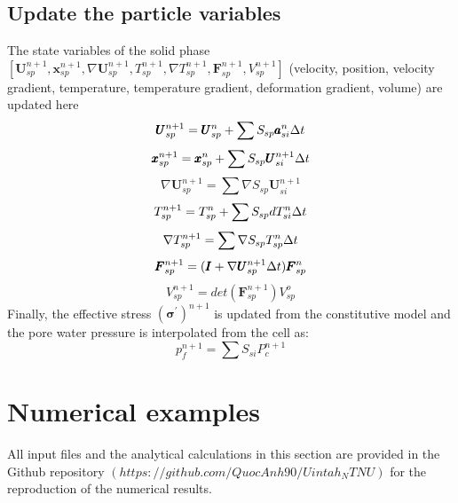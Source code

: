 \documentclass[preprint,12pt]{elsarticle}
\begin{document}
\subsection{\textsf{Update the particle variables}}
%
%
The state variables of the solid phase $[\pmb{U}_{sp}^{n+1},\pmb{x}_{sp}^{n+1},\nabla \pmb{U}_{sp}^{n+1}, T_{sp}^{n+1},  \nabla T_{sp}^{n+1}, \pmb{F}_{sp}^{n+1},V_{sp}^{n+1}]$ (velocity, position, velocity gradient, temperature, temperature gradient, deformation gradient, volume) are updated here 
%
%
\begin{equation}
     \pmb{U}_{sp}^{n+1} = \pmb{U}_{sp}^n + \sum{S_{sp} \pmb{a}_{si}^n \ensuremath{\Delta{t}} } 
\end {equation}
%
%
\begin{equation}
     \pmb{x}_{sp}^{n+1} = \pmb{x}_{sp}^n + \sum{S_{sp} \pmb{U}_{si}^{n+1} \ensuremath{\Delta{t}} } 
\end {equation}
%
%
\begin{equation}
    \nabla \pmb{U}_{sp}^{n+1} = \sum{\nabla S_{sp} \pmb{U}_{si}^{n+1}} 
\end {equation}
%
%
\begin{equation}
     T_{sp}^{n+1} = T_{sp}^n + \sum{S_{sp} dT_{si}^n \ensuremath{\Delta{t}} } 
\end {equation}
%
%
\begin{equation}
     \nabla T_{sp}^{n+1} = \sum{\nabla S_{sp} T_{sp}^n \ensuremath{\Delta{t}} } 
\end {equation}
%
%
\begin{equation}
     \pmb{F}_{sp}^{n+1} = (\pmb{I} + \nabla \pmb{U}_{sp}^{n+1} \Delta{t})\pmb{F}_{sp}^n
\end {equation}
%
%
\begin{equation}
     V_{sp}^{n+1} = det(\pmb{F}_{sp}^{n+1}) V_{sp}^o
\end {equation}
%
%
Finally, the effective stress $(\pmb{\sigma}^\prime)^{n+1}$ is updated from the constitutive model and the pore water pressure is interpolated from the cell as:
%
%
\begin{equation}
     p_{f}^{n+1} = \sum{S_{si} P_{c}^{n+1}} 
\end {equation}
%
%
\section{\textsf{Numerical examples}}
All input files and the analytical calculations in this section are provided in the Github repository $(https://github.com/QuocAnh90/Uintah_NTNU)$ for the reproduction of the numerical results.\\
\end{document}
